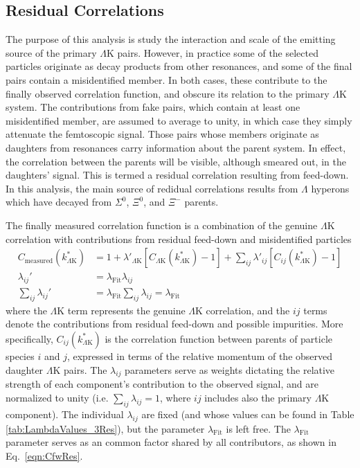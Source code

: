 \documentclass[ALICE,manyauthors]{cernphprep}
\newcommand{\Lam}{$\Lambda$\xspace}
\newcommand{\LamK}{$\Lambda$K\xspace}
\begin{document}
\subsection{Residual Correlations}
\label{ResidualCorrelations}

The purpose of this analysis is study the interaction and scale of the emitting source of the primary \LamK pairs.
However, in practice some of the selected particles originate as decay products from other resonances, and some of the final pairs contain a misidentified member.
In both cases, these contribute to the finally observed correlation function, and obscure its relation to the primary \LamK system.
The contributions from fake pairs, which contain at least one misidentified member, are assumed to average to unity, in which case they simply attenuate the femtoscopic signal.
Those pairs whose members originate as daughters from resonances carry information about the parent system.
In effect, the correlation between the parents will be visible, although smeared out, in the daughters' signal.
This is termed a residual correlation resulting from feed-down.  
In this analysis, the main source of redidual correlations results from \Lam hyperons which have decayed from $\Sigma^{0}$, $\Xi^{0}$, and $\Xi^{-}$ parents.




The finally measured correlation function is a combination of the genuine \LamK correlation with contributions from residual feed-down and misidentified particles
\begin{equation}
\begin{aligned}
\label{eqn:CfwRes} 
 C_{\mathrm{measured}}(k^{*}_{\Lambda\mathrm{K}}) &= 1 + \lambda'_{\Lambda\mathrm{K}}[C_{\Lambda\mathrm{K}}(k^{*}_{\Lambda\mathrm{K}}) - 1] + \sum\limits_{ij}  \lambda'_{ij}[C_{ij}(k^{*}_{\Lambda\mathrm{K}})-1] \\
 \lambda_{ij}' &= \lambda_{\mathrm{Fit}}\lambda_{ij} \\
 \sum\limits_{ij}\lambda_{ij}' &=  \lambda_{\mathrm{Fit}}\sum\limits_{ij}\lambda_{ij} = \lambda_{\mathrm{Fit}}
\end{aligned} 
\end{equation}
where the \LamK term represents the genuine \LamK correlation, and the $ij$ terms denote the contributions from residual feed-down and possible impurities.
More specifically, $C_{ij}(k^{*}_{\Lambda\mathrm{K}})$ is the correlation function between parents of particle species $i$ and $j$, expressed in terms of the relative momentum of the observed daughter \LamK pairs.  
The $\lambda_{ij}$ parameters serve as weights dictating the relative strength of each component's contribution to the observed signal, and are normalized to unity (i.e. $\sum_{ij} \lambda_{ij} = 1$, where $ij$ includes also the primary \LamK component).
The individual $\lambda_{ij}$ are fixed (and whose values can be found in Table \ref{tab:LambdaValues_3Res}), but the parameter $\lambda_{\mathrm{Fit}}$ is left free.
The $\lambda_{\mathrm{Fit}}$ parameter serves as an common factor shared by all contributors, as shown in Eq.\ \ref{eqn:CfwRes}.
\end{document}
